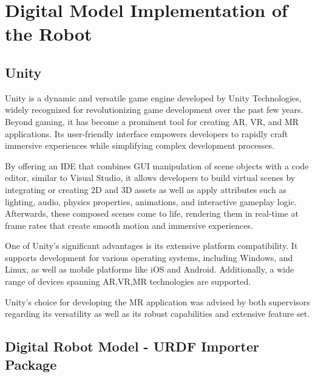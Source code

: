 \section{Digital Model Implementation of the Robot}
\label{section:digital-model}

\subsection{Unity}

Unity is a dynamic and versatile game engine developed by Unity Technologies, widely recognized for revolutionizing game development over the past few years. Beyond gaming, it has become a prominent tool for creating \ac{AR}, \ac {VR}, and \ac{MR} applications. Its user-friendly interface empowers developers to rapidly craft immersive experiences while simplifying complex development processes.

By offering an \ac{IDE} that combines \ac{GUI} manipulation of scene objects with a code editor, similar to Visual Studio, it allows developers to build virtual scenes by integrating or creating 2D and 3D assets as well as apply attributes such as lighting, audio, physics properties, animations, and interactive gameplay logic. Afterwards, these composed scenes come to life, rendering them in real-time at frame rates that create smooth motion and immersive experiences.

One of Unity's significant advantages is its extensive platform compatibility. It supports development for various operating systems, including Windows, and Linux, as well as mobile platforms like iOS and Android. Additionally, a wide range of devices spanning \ac{AR},\ac{VR},\ac{MR} technologies are supported.

Unity's choice for developing the \ac{MR} application was advised by both supervisors regarding its versatility as well as its robust capabilities and extensive feature set.

\subsection{Digital Robot Model - URDF Importer Package}

